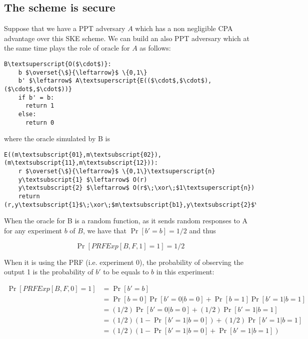 \documentclass{article}
\newcommand{\xor}{\oplus}
\begin{document}
\subsection{The scheme is secure}

Suppose that we have a PPT adversary $A$ which has a non negligible CPA advantage over 
this SKE scheme. We can build an also PPT adversary which at the same time plays the role 
of oracle for $A$ as follows:

\begin{Verbatim}[commandchars=\\\{\},codes={\catcode`$=3\catcode`_=8}]
  B\textsuperscript{O($\cdot$)}:
    b $\overset{\$}{\leftarrow}$ \{0,1\}
    b' $\leftarrow$ A\textsuperscript{E(($\cdot$,$\cdot$),($\cdot$,$\cdot$))}
    if b' = b:
      return 1
    else:
      return 0
\end{Verbatim}

where the oracle simulated by B is

\begin{Verbatim}[commandchars=\\\{\},codes={\catcode`$=3\catcode`_=8}]
  E((m\textsubscript{01},m\textsubscript{02}),(m\textsubscript{11},m\textsubscript{12})):
    r $\overset{\$}{\leftarrow}$ \{0,1\}\textsuperscript{n}
    y\textsubscript{1} $\leftarrow$ O(r)
    y\textsubscript{2} $\leftarrow$ O(r$\;\xor\;$1\textsuperscript{n})
    return (r,y\textsubscript{1}$\;\xor\;$m\textsubscript{b1},y\textsubscript{2}$\;\xor\;$m\textsubscript{b2})
\end{Verbatim}

When the oracle for B is a random function, as it sends random 
responses to A for any experiment $b$ of $B$, we have that 
$\Pr[b' = b]=1/2$ and thus 

$$\Pr[PRFExp[B,F,1]=1]=1/2$$

When it is using the PRF (i.e. experiment 0), the probability of 
observing the output 1 is the probability of $b'$ to be equals to $b$
in this experiment:

\begin{align*}
  \Pr[PRFExp[B,F,0]=1] 
    &= \Pr[b' = b] \\
    &= \Pr[b = 0]\Pr[b' = 0 | b = 0] + \Pr[b = 1]\Pr[ b' = 1 | b = 1] \\
    &= (1/2)\Pr[b' = 0 | b = 0] + (1/2)\Pr[ b' = 1 | b = 1] \\  
    &= (1/2)(1 - \Pr[b' = 1 | b = 0]) + (1/2)\Pr[ b' = 1 | b = 1] \\
    &= (1/2)(1 - \Pr[b' = 1 | b = 0] + \Pr[ b' = 1 | b = 1]) \\
\end{align*}
\end{document}
